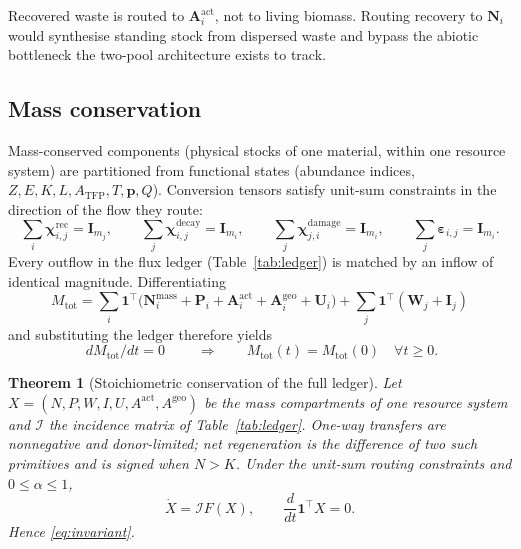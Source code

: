 \documentclass[11pt]{article}
\newtheorem{theorem}{Theorem}
\theoremstyle{definition}
\begin{document}
Recovered waste is routed to $\mathbf A^{\mathrm{act}}_i$, not to living biomass. Routing recovery to $\mathbf N_i$ would synthesise standing stock from dispersed waste and bypass the abiotic bottleneck the two-pool architecture exists to track.

\subsection{Mass conservation}

Mass-conserved components (physical stocks of one material, within one resource system) are partitioned from functional states (abundance indices, $Z,E,K,L,A_{\mathrm{TFP}},T,\mathbf p,Q$). Conversion tensors satisfy unit-sum constraints in the direction of the flow they route:
\begin{equation}
\sum_i\boldsymbol\chi^{\mathrm{rec}}_{i,j}=\mathbf I_{m_j},\qquad
\sum_j\boldsymbol\chi^{\mathrm{decay}}_{i,j}=\mathbf I_{m_i},\qquad
\sum_j\boldsymbol\chi^{\mathrm{damage}}_{j,i}=\mathbf I_{m_i},\qquad
\sum_j\boldsymbol\varepsilon_{i,j}=\mathbf I_{m_i}.
\end{equation}
Every outflow in the flux ledger (Table~\ref{tab:ledger}) is matched by an inflow of identical magnitude. Differentiating
\begin{equation}
M_{\mathrm{tot}}
= \sum_i\mathbf 1^\top\bigl(\mathbf N_i^{\mathrm{mass}}+\mathbf P_i+\mathbf A^{\mathrm{act}}_i+\mathbf A^{\mathrm{geo}}_i+\mathbf U_i\bigr)
+ \sum_j\mathbf 1^\top(\mathbf W_j+\mathbf I_j)
\end{equation}
and substituting the ledger therefore yields
\begin{equation}
\boxed{\;dM_{\mathrm{tot}}/dt=0\;}\qquad\Rightarrow\qquad M_{\mathrm{tot}}(t)=M_{\mathrm{tot}}(0)\quad\forall t\ge 0.
\label{eq:invariant}
\end{equation}

\begin{theorem}[Stoichiometric conservation of the full ledger]
\label{thm:mass-conservation}
Let $X=(N,P,W,I,U,A^{\mathrm{act}},A^{\mathrm{geo}})$ be the mass compartments of one resource system and $\mathcal I$ the incidence matrix of Table~\ref{tab:ledger}. One-way transfers are nonnegative and donor-limited; net regeneration is the difference of two such primitives and is signed when $N>K$. Under the unit-sum routing constraints and $0\le\alpha\le 1$,
\[
\dot X=\mathcal I F(X),\qquad \frac{d}{dt}\mathbf 1^\top X=0.
\]
Hence \eqref{eq:invariant}.
\end{theorem}
\end{document}
